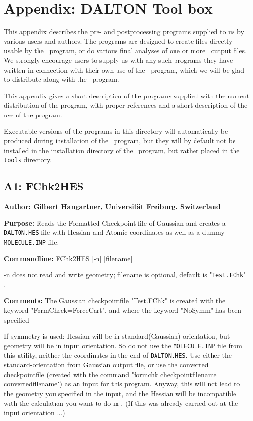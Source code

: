 \section*{Appendix: DALTON Tool box}

This appendix describes the pre- and postprocessing programs
supplied to us by various users and authors. The programs are designed
to create files directly usable by the \siraba\ program, or do
various final analyses of one or more \siraba\ output files. We
strongly encourage users to supply us with any such programs they have
written in connection with their own use of the \siraba\ program,
which we will be glad to distribute along with the \siraba\
program.

This appendix gives a short description of the programs supplied with
the current distribution of the program, with proper references and a
short description of the use of the program.

Executable versions of the programs in this directory will
automatically be produced during installation of the \siraba\ program,
but they will by default not be installed in the installation
directory of the \siraba\ program, but rather placed in the
\verb|tools| directory.

\subsection*{A1: FChk2HES}

\noindent
{\large\bf Author: \normalsize\large Gilbert Hangartner,
Universit\"{a}t Freiburg, Switzerland}

\smallskip

\noindent 
{\bf Purpose:} Reads the Formatted Checkpoint file of Gaussian  
     and creates a \verb|DALTON.HES| file with Hessian and Atomic coordinates
     as well as a dummy \verb|MOLECULE.INP| file.

\smallskip
\noindent
{\bf Commandline:} FChk2HES [-n] [filename]

-n does not read and write geometry; filename is optional, default is
"\verb|Test.FChk|" .

\smallskip
\noindent
{\bf Comments:}     The Gaussian checkpointfile "Test.FChk" is created
     with the keyword "FormCheck=ForceCart", and where the keyword "NoSymm"
     has  been specified

If symmetry is used: Hessian will be in standard(Gaussian) orientation,
        but geometry will be in input orientation. So do not use the
        \verb|MOLECULE.INP| file from this utility, 
        neither the coordinates in the end of \verb|DALTON.HES|.
        Use either the standard-orientation from Gaussian output file, or
        use the converted checkpointfile (created with the command
        "formchk checkpointfilename convertedfilename") as an input for
        this program. Anyway, this will not lead to the geometry you 
        specified in the input, and the Hessian will be incompatible with the
        calculation you want to do in \siraba. (If this was already carried
        out at the input orientation ...)

